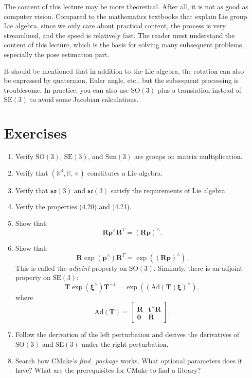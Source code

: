 The content of this lecture may be more theoretical. After all, it is not as good as computer vision. Compared to the mathematics textbooks that explain Lie group Lie algebra, since we only care about practical content, the process is very streamlined, and the speed is relatively fast. The reader must understand the content of this lecture, which is the basis for solving many subsequent problems, especially the pose estimation part.

It should be mentioned that in addition to the Lie algebra, the rotation can also be expressed by quaternion, Euler angle, etc., but the subsequent processing is troublesome. In practice, you can also use $\mathrm{SO}(3)$ plus a translation instead of $\mathrm{SE}(3)$ to avoid some Jacobian calculations.

\section*{Exercises}
\begin{enumerate}
    \item Verify $\mathrm{SO}(3)$, $\mathrm{SE}(3)$, and $\mathrm{Sim}(3)$ are groups on matrix multiplication.
    \item Verify that $( \mathbb{R}^3, \mathbb{R}, \times )$ constitutes a Lie algebra.
    \item Verify that $\mathfrak{so}(3)$ and $\mathfrak{se}(3)$ satisfy the requirements of Lie algebra.
    \item Verify the properties (4.20) and (4.21).
    \item Show that: \[
    \mathbf{R} \mathbf{p}^\wedge \mathbf{R}^T = (\mathbf{Rp})^\wedge .\]
    \item Show that: \[
    \mathbf{R} \exp( \mathbf{p}^\wedge) \mathbf{R}^T = \exp( (\mathbf{Rp})^\wedge ).\] This is called the \textit{adjoint} property on $\mathrm{SO}(3)$. Similarly, there is an adjoint property on $\mathrm{SE}(3)$:
    \begin{equation}
    \mathbf{T} \exp(\boldsymbol{\xi}^\wedge)\mathbf{T}^{-1} = \exp \left( \left( \mathrm{Ad}(\mathbf{T}) \boldsymbol{\xi} \right) ^\wedge \right),
    \end{equation}
    where
    \begin{equation}
    \label{eq:adjSE3}
    \mathrm{Ad} ( \mathbf{T} ) = \left[ {\begin{array}{*{20}{c}}
        \mathbf{R} &{{ \mathbf{t} ^ \wedge } \mathbf{R} }\\
        \mathbf{0} & \mathbf{R}
        \end{array}} \right].
    \end{equation}
    \item Follow the derivation of the left perturbation and derives the derivatives of $\mathrm{SO}(3)$ and $\mathrm{SE}(3)$ under the right perturbation.
    \item Search how CMake's \textit{find\_package} works. What optional parameters does it have? What are the prerequisites for CMake to find a library?
\end{enumerate}
